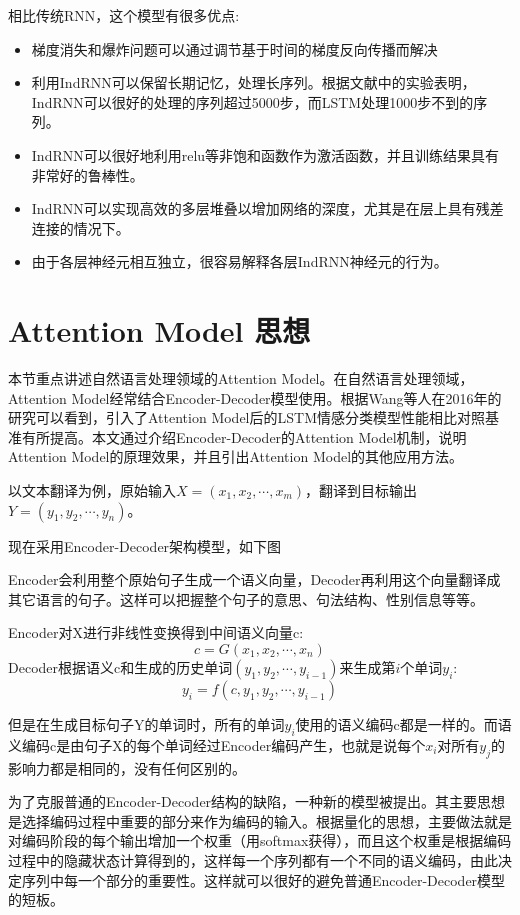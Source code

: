 \documentclass[a4paper,AutoFakeBold,oneside,12pt]{book}
\begin{document}
相比传统RNN，这个模型有很多优点:
\begin{itemize}
    \item 梯度消失和爆炸问题可以通过调节基于时间的梯度反向传播而解决
    \item 利用IndRNN可以保留长期记忆，处理长序列。根据文献中的实验表明，IndRNN可以很好的处理的序列超过5000步，而LSTM处理1000步不到的序列。
    \item IndRNN可以很好地利用relu等非饱和函数作为激活函数，并且训练结果具有非常好的鲁棒性。
    \item IndRNN可以实现高效的多层堆叠以增加网络的深度，尤其是在层上具有残差连接的情况下。
    \item 由于各层神经元相互独立，很容易解释各层IndRNN神经元的行为。
\end{itemize}


\section{Attention Model 思想}
本节重点讲述自然语言处理领域的Attention Model。在自然语言处理领域，Attention Model经常结合Encoder-Decoder模型使用\cite{vaswaniAttentionAllYou2017}。根据Wang等人在2016年的研究可以看到，引入了Attention Model后的LSTM情感分类模型性能相比对照基准有所提高\cite{wangAttentionbasedLSTMAspectlevel2016}。本文通过介绍Encoder-Decoder的Attention Model机制，说明Attention Model的原理效果，并且引出Attention Model的其他应用方法。

以文本翻译为例，原始输入$ X = (x_1, x_2, \cdots, x_m) $，翻译到目标输出$Y = (y_1, y_2, \cdots, y_n)$。

现在采用Encoder-Decoder架构模型，如下图

Encoder会利用整个原始句子生成一个语义向量，Decoder再利用这个向量翻译成其它语言的句子。这样可以把握整个句子的意思、句法结构、性别信息等等。

Encoder对X进行非线性变换得到中间语义向量c:
$$c = G(x_1, x_2, \cdots, x_n)$$
Decoder根据语义c和生成的历史单词$(y_1, y_2, \cdots, y_{i-1})$来生成第$i$个单词$y_i$:
$$y_i = f(c, y_1, y_2, \cdots, y_{i-1})$$

但是在生成目标句子Y的单词时，所有的单词$y_i$使用的语义编码c都是一样的。而语义编码c是由句子X的每个单词经过Encoder编码产生，也就是说每个$x_i$对所有$y_j$的影响力都是相同的，没有任何区别的。

为了克服普通的Encoder-Decoder结构的缺陷，一种新的模型被提出。其主要思想是选择编码过程中重要的部分来作为编码的输入。根据量化的思想，主要做法就是对编码阶段的每个输出增加一个权重（用softmax获得），而且这个权重是根据编码过程中的隐藏状态计算得到的，这样每一个序列都有一个不同的语义编码，由此决定序列中每一个部分的重要性。这样就可以很好的避免普通Encoder-Decoder模型的短板。
\end{document}
